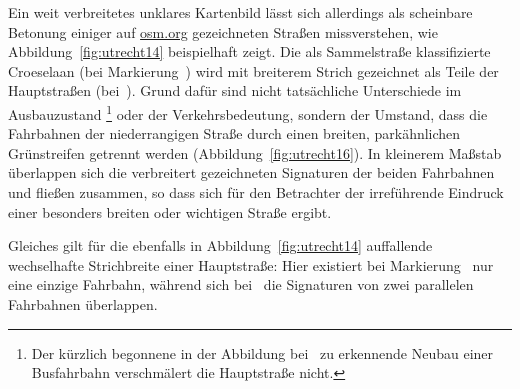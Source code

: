 \documentclass[../main/thesis.tex]{subfiles}
\begin{document}
Ein weit verbreitetes unklares Kartenbild lässt sich allerdings als scheinbare Betonung einiger auf \url{osm.org} gezeichneten Straßen missverstehen, wie Abbildung~\ref{fig:utrecht14} beispielhaft zeigt.
Die als Sammelstraße klassifizierte Croeselaan (bei Markierung~) wird mit breiterem Strich gezeichnet als Teile der Hauptstraßen (bei~).
Grund dafür sind nicht tatsächliche Unterschiede im Ausbauzustand%
\footnote{Der kürzlich begonnene in der Abbildung bei~ zu erkennende Neubau einer Busfahrbahn verschmälert die Hauptstraße nicht.}
oder der Verkehrsbedeutung, sondern der Umstand, dass die Fahrbahnen der niederrangigen Straße durch einen breiten, parkähnlichen Grünstreifen getrennt werden  (Abbildung~\ref{fig:utrecht16}).
In kleinerem Maßstab überlappen sich die verbreitert gezeichneten Signaturen der beiden Fahrbahnen und fließen zusammen, so dass sich für den Betrachter der irreführende Eindruck einer besonders breiten oder wichtigen Straße ergibt.

Gleiches gilt für die ebenfalls in Abbildung~\ref{fig:utrecht14} auffallende wechselhafte Strichbreite einer Hauptstraße:
Hier existiert bei Markierung~ nur eine einzige Fahrbahn, während sich bei~ die Signaturen von zwei parallelen Fahrbahnen überlappen.

\end{document}
